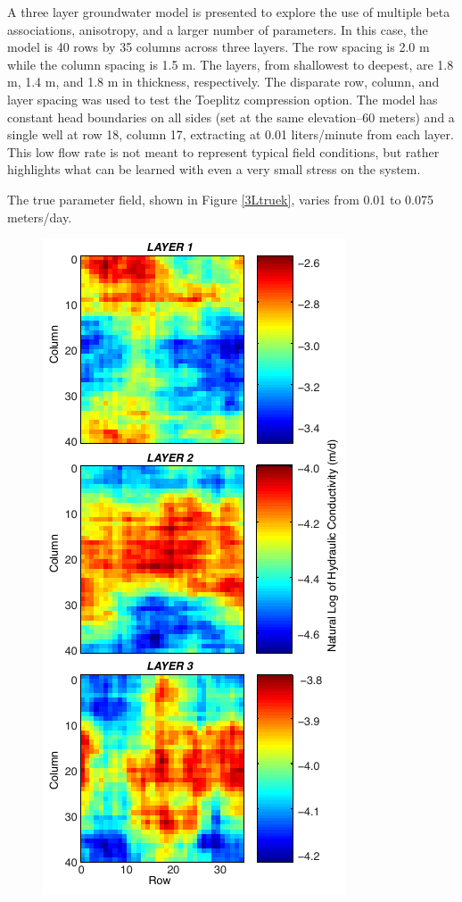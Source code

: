 \documentclass[11pt,oneside,onecolumn]{usgsreport}
\begin{document}
\begin{appendix}
A three layer groundwater model is presented to explore the use of
multiple beta associations, anisotropy, and a larger number of parameters.
In this case, the model is 40 rows by 35 columns across three layers.
The row spacing is 2.0 m while the column spacing is 1.5 m. The layers,
from shallowest to deepest, are 1.8 m, 1.4 m, and 1.8 m in thickness,
respectively. The disparate row, column, and layer spacing was used
to test the Toeplitz compression option. The model has constant head
boundaries on all sides (set at the same elevation--60 meters) and
a single well at row 18, column 17, extracting at 0.01 liters/minute
from each layer. This low flow rate is not meant to represent typical
field conditions, but rather highlights what can be learned with even
a very small stress on the system.

The true parameter field, shown in Figure \ref{3Ltruek}, varies from
0.01 to 0.075 meters/day. 

\begin{figure}[!t]
\begin{center}\includegraphics{figures/3_layer_TRUE_K_field}\end{center}


\end{figure}
\end{appendix}
\end{document}
